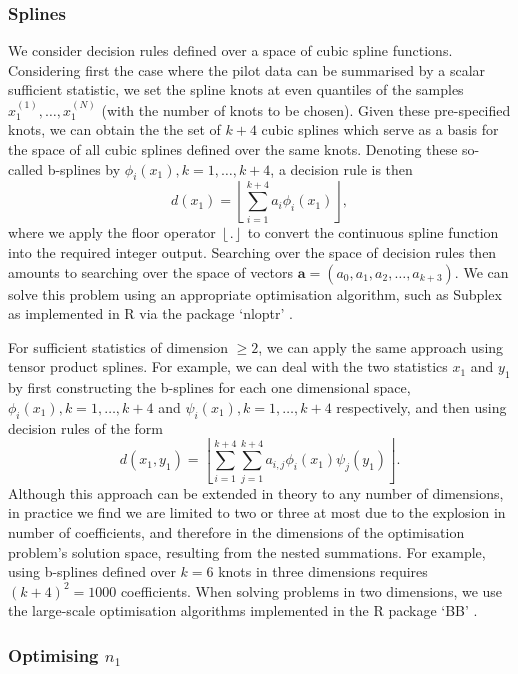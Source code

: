 \documentclass[sagev, Crown]{sagej} %
\begin{document}
\subsubsection{Splines}

We consider decision rules defined over a space of cubic spline functions. Considering first the case where the pilot data can be summarised by a scalar sufficient statistic, we set the spline knots at even quantiles of the samples $x_1^{(1)}, \ldots , x_1^{(N)}$ (with the number of knots to be chosen). Given these pre-specified knots, we can obtain the the set of $k + 4$ cubic splines which serve as a basis for the space of all cubic splines defined over the same knots. Denoting these so-called b-splines by $\phi_i(x_1), k=1,\ldots,k+4$, a decision rule is then
$$
d(x_1) = \left\lfloor \sum_{i=1}^{k+4} a_i \phi_i(x_1) \right\rfloor,
$$
where we apply the floor operator $\left\lfloor . \right\rfloor$ to convert the continuous spline function into the required integer output. Searching over the space of decision rules then amounts to searching over the space of vectors $\mathbf{a} = (a_0, a_1, a_2, \ldots , a_{k+3})$. We can solve this problem using an appropriate optimisation algorithm, such as Subplex \cite{Rowan1990} as implemented in R via the package `nloptr' \cite{Ypma2018}.

For sufficient statistics of dimension $\geq 2$, we can apply the same approach using tensor product splines. For example, we can deal with the two statistics $x_1$ and $y_1$ by first constructing the b-splines for each one dimensional space, $\phi_i(x_1), k=1,\ldots,k+4$ and $\psi_i(x_1), k=1,\ldots,k+4$ respectively, and then using decision rules of the form 
$$
d(x_1, y_1) = \left\lfloor \sum_{i=1}^{k+4} \sum_{j=1}^{k+4} a_{i,j} \phi_i(x_1) \psi_j(y_1) \right\rfloor.
$$
Although this approach can be extended in theory to any number of dimensions, in practice we find we are limited to two or three at most due to the explosion in number of coefficients, and therefore in the dimensions of the optimisation problem's solution space, resulting from the nested summations. For example, using b-splines defined over $k = 6$ knots in three dimensions requires $(k+4)^2 = 1000$ coefficients. When solving problems in two dimensions, we use the large-scale optimisation algorithms implemented in the R package `BB' \cite{Varadhan2009}.

\subsubsection{Optimising $n_1$}
\end{document}
